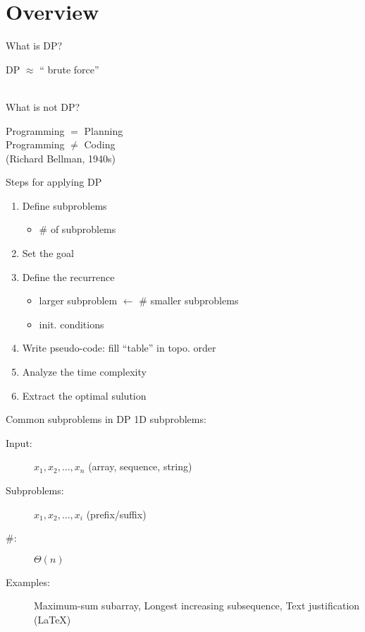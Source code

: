 \section{Overview}

\begin{frame}{What is DP?}
  \begin{center}
	DP $\approx$ `` brute force'' \\[8pt]
	 \\[8pt]
  \end{center}
\end{frame}
\begin{frame}{What is not DP?}
  \begin{center}
	Programming $=$ Planning \\[15pt] \pause
	Programming $\neq$ Coding \\[5pt]
	(Richard Bellman, 1940s)
  \end{center}
\end{frame}
\begin{frame}{Steps for applying DP}
  \begin{enumerate}
	\item Define subproblems
	  \begin{itemize}
		\item \# of subproblems
	  \end{itemize}
	\item Set the goal
	\item Define the recurrence
	  \begin{itemize}
		\item larger subproblem $\gets$ \# smaller subproblems
		\item init. conditions
	  \end{itemize}
	  \pause
	\item Write pseudo-code: fill ``table'' in topo. order
	\item Analyze the time complexity
	\item Extract the optimal sulution
  \end{enumerate}
\end{frame}
\begin{frame}{Common subproblems in DP}
  1D subproblems:
  \begin{description}
	\item[Input:] $x_1, x_2, \dots, x_n$ (array, sequence, string)
	\item[Subproblems:] $x_1, x_2, \dots, x_i$ (prefix/suffix)
	\item[\#:] $\Theta(n)$
	\item[Examples:] Maximum-sum subarray, Longest increasing subsequence, Text justification (\LaTeX)
  \end{description}
\end{frame}
